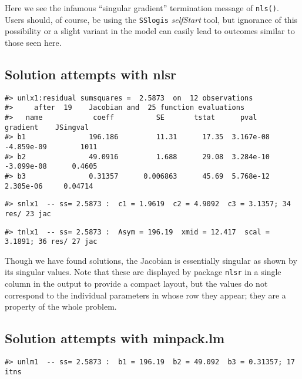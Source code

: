 Here we see the infamous ``singular gradient'' termination message of \texttt{nls()}.
Users should, of course, be using the \texttt{SSlogis} \emph{selfStart} tool, but ignorance
of this possibility or a slight variant in the model can easily lead to outcomes
similar to those seen here.

\hypertarget{solution-attempts-with-nlsr}{%
\subsection{Solution attempts with nlsr}\label{solution-attempts-with-nlsr}}

\begin{verbatim}
#> unlx1:residual sumsquares =  2.5873  on  12 observations
#>     after  19    Jacobian and  25 function evaluations
#>   name            coeff          SE       tstat      pval      gradient    JSingval   
#> b1               196.186         11.31      17.35  3.167e-08  -4.859e-09        1011  
#> b2               49.0916         1.688      29.08  3.284e-10  -3.099e-08      0.4605  
#> b3               0.31357      0.006863      45.69  5.768e-12   2.305e-06     0.04714
\end{verbatim}

\begin{verbatim}
#> snlx1  -- ss= 2.5873 :  c1 = 1.9619  c2 = 4.9092  c3 = 3.1357; 34 res/ 23 jac
\end{verbatim}

\begin{verbatim}
#> tnlx1  -- ss= 2.5873 :  Asym = 196.19  xmid = 12.417  scal = 3.1891; 36 res/ 27 jac
\end{verbatim}

Though we have found solutions, the Jacobian is essentially singular as
shown by its singular
values. Note that these are displayed by package \texttt{nlsr} in a single column in
the output to provide a compact layout, but the values do not correspond to
the individual parameters in
whose row they appear; they are a property of the whole problem.

\hypertarget{solution-attempts-with-minpack.lm}{%
\subsection{Solution attempts with minpack.lm}\label{solution-attempts-with-minpack.lm}}

\begin{verbatim}
#> unlm1  -- ss= 2.5873 :  b1 = 196.19  b2 = 49.092  b3 = 0.31357; 17  itns
\end{verbatim}

